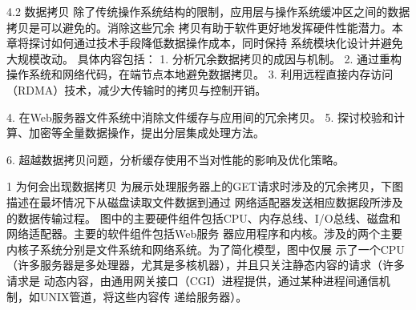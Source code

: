 
4.2 数据拷贝
除了传统操作系统结构的限制，应用层与操作系统缓冲区之间的数据拷贝是可以避免的。消除这些冗余
拷贝有助于软件更好地发挥硬件性能潜力。本章将探讨如何通过技术手段降低数据操作成本，同时保持
系统模块化设计并避免大规模改动。
具体内容包括：
 1. 分析冗余数据拷贝的成因与机制。
 2. 通过重构操作系统和网络代码，在端节点本地避免数据拷贝。
 3. 利用远程直接内存访问（RDMA）技术，减少大传输时的拷贝与控制开销。

 4. 在Web服务器文件系统中消除文件缓存与应用间的冗余拷贝。
 5. 探讨校验和计算、加密等全量数据操作，提出分层集成处理方法。

 6. 超越数据拷贝问题，分析缓存使用不当对性能的影响及优化策略。


1 为何会出现数据拷贝
为展示处理服务器上的GET请求时涉及的冗余拷贝，下图描述在最坏情况下从磁盘读取文件数据到通过
网络适配器发送相应数据段所涉及的数据传输过程。
图中的主要硬件组件包括CPU、内存总线、I/O总线、磁盘和网络适配器。主要的软件组件包括Web服务
器应用程序和内核。涉及的两个主要内核子系统分别是文件系统和网络系统。为了简化模型，图中仅展
示了一个CPU（许多服务器是多处理器，尤其是多核机器），并且只关注静态内容的请求（许多请求是
动态内容，由通用网关接口（CGI）进程提供，通过某种进程间通信机制，如UNIX管道，将这些内容传
递给服务器）。





